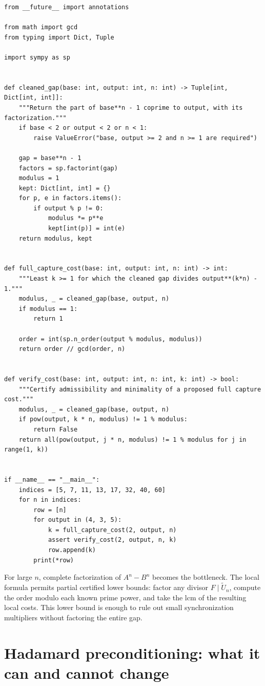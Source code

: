 \documentclass[11pt,oneside]{article}
\theoremstyle{definition}
\theoremstyle{remark}
\begin{document}
\begin{lstlisting}[style=pythonstyle,caption={Exact full-capture cost for a diagonal pair.},label={lst:capture}]
from __future__ import annotations

from math import gcd
from typing import Dict, Tuple

import sympy as sp


def cleaned_gap(base: int, output: int, n: int) -> Tuple[int, Dict[int, int]]:
    """Return the part of base**n - 1 coprime to output, with its factorization."""
    if base < 2 or output < 2 or n < 1:
        raise ValueError("base, output >= 2 and n >= 1 are required")

    gap = base**n - 1
    factors = sp.factorint(gap)
    modulus = 1
    kept: Dict[int, int] = {}
    for p, e in factors.items():
        if output % p != 0:
            modulus *= p**e
            kept[int(p)] = int(e)
    return modulus, kept


def full_capture_cost(base: int, output: int, n: int) -> int:
    """Least k >= 1 for which the cleaned gap divides output**(k*n) - 1."""
    modulus, _ = cleaned_gap(base, output, n)
    if modulus == 1:
        return 1

    order = int(sp.n_order(output % modulus, modulus))
    return order // gcd(order, n)


def verify_cost(base: int, output: int, n: int, k: int) -> bool:
    """Certify admissibility and minimality of a proposed full capture cost."""
    modulus, _ = cleaned_gap(base, output, n)
    if pow(output, k * n, modulus) != 1 % modulus:
        return False
    return all(pow(output, j * n, modulus) != 1 % modulus for j in range(1, k))


if __name__ == "__main__":
    indices = [5, 7, 11, 13, 17, 32, 40, 60]
    for n in indices:
        row = [n]
        for output in (4, 3, 5):
            k = full_capture_cost(2, output, n)
            assert verify_cost(2, output, n, k)
            row.append(k)
        print(*row)
\end{lstlisting}

For large $n$, complete factorization of $A^n-B^n$ becomes the bottleneck.  The local formula
permits partial certified lower bounds: factor any divisor $F\mid\widetilde U_n$, compute the
order modulo each known prime power, and take the lcm of the resulting local costs.  This
lower bound is enough to rule out small synchronization multipliers without factoring the
entire gap.

\section{Hadamard preconditioning: what it can and cannot change}
\label{sec:hadamard}
\end{document}
